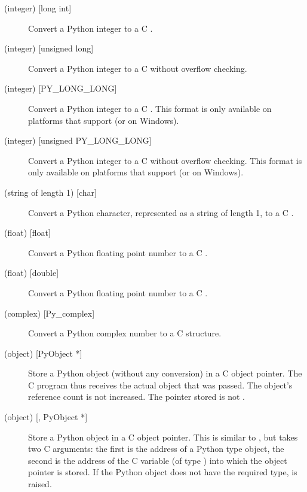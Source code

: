 \begin{description}
  \item[ (integer) {[long int]}]
  Convert a Python integer to a C .

  \item[ (integer) {[unsigned long]}]
  Convert a Python integer to a C  without
  overflow checking.  

  \item[ (integer) {[PY_LONG_LONG]}]
  Convert a Python integer to a C .  This format is
  only available on platforms that support  (or
   on Windows).

  \item[ (integer) {[unsigned PY_LONG_LONG]}]
  Convert a Python integer to a C 
  without overflow checking.  This format is only available on
  platforms that support  (or
   on Windows).  

  \item[ (string of length 1) {[char]}]
  Convert a Python character, represented as a string of length 1, to
  a C .

  \item[ (float) {[float]}]
  Convert a Python floating point number to a C .

  \item[ (float) {[double]}]
  Convert a Python floating point number to a C .

  \item[ (complex) {[Py_complex]}]
  Convert a Python complex number to a C  structure.

  \item[ (object) {[PyObject *]}]
  Store a Python object (without any conversion) in a C object
  pointer.  The C program thus receives the actual object that was
  passed.  The object's reference count is not increased.  The pointer
  stored is not \NULL.

  \item[ (object) {[, PyObject *]}]
  Store a Python object in a C object pointer.  This is similar to
  , but takes two C arguments: the first is the address of a
  Python type object, the second is the address of the C variable (of
  type ) into which the object pointer is stored.  If
  the Python object does not have the required type,
   is raised.


\end{description}
